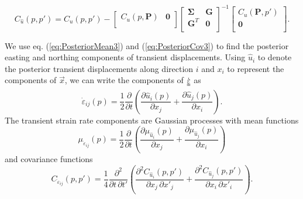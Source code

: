 \documentclass[10pt,letter]{article}
\newcommand*{\du}[1]{\uuline{#1}}
\begin{document}
\begin{equation}\label{eq:PosteriorCov3}
C_{\hat{u}}(p,p') = C_u(p,p') - 
                    \left[\begin{array}{cc}
                          C_u(p,\bm{P}) & \bm{0} \\
                          \end{array}\right]
                    \left[\begin{array}{cc}
                          \bm{\Sigma} & \bm{G} \\
                          \bm{G}^T  & \bm{0} \\
                          \end{array}\right]^{-1}
                    \left[\begin{array}{c}
                          C_u(\bm{P},p') \\
                          \bm{0} \\
                          \end{array}\right].
\end{equation}

We use eq. (\ref{eq:PosteriorMean3}) and (\ref{eq:PosteriorCov3}) to find the posterior easting and northing components of transient displacements. Using $\hat{u}_i$ to denote the posterior transient displacements along direction $i$ and $x_i$ to represent the components of $\vec{x}$, we can write the components of $\dot{\du{\varepsilon}}$ as 
\begin{equation}\label{eq:StrainRate}
\dot{\varepsilon}_{ij}(p) = \frac{1}{2} \frac{\partial}{\partial t} \left(
                                        \frac{\partial \hat{u}_i(p)}{\partial x_j} +  
                                        \frac{\partial \hat{u}_j(p)}{\partial x_i}\right).
\end{equation}
The transient strain rate components are Gaussian processes with mean functions
\begin{equation}\label{eq:StrainMean}
\mu_{\dot{\varepsilon}_{ij}}(p) = \frac{1}{2}\frac{\partial}{\partial t}\left(
                                  \frac{\partial \mu_{\hat{u}_i}(p)}{\partial x_j} + 
                                  \frac{\partial \mu_{\hat{u}_j}(p)}{\partial x_i} \right)
\end{equation} 
and covariance functions
\begin{equation}\label{eq:StrainCov}
C_{\dot{\varepsilon}_{ij}}(p,p') = \frac{1}{4} \frac{\partial^2}{\partial t \, \partial t'}\left(
                                   \frac{\partial^2 C_{\hat{u}_i}(p,p')}{\partial x_j \, \partial x'_j} + 
                                   \frac{\partial^2 C_{\hat{u}_j}(p,p')}{\partial x_i \, \partial x'_i} \right).
\end{equation} 
\end{document}
